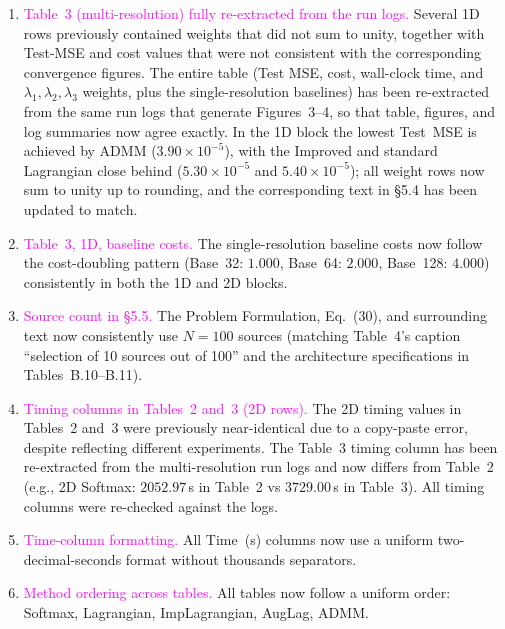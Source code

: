 \documentclass{article}
\newcommand{\audit}[1]{\textcolor{magenta}{#1}}  %
\begin{document}
\begin{enumerate}[leftmargin=*,itemsep=0.4em]
    \item \audit{Table~3 (multi-resolution) fully re-extracted from the run
    logs.} Several 1D rows previously contained weights that did not sum to
    unity, together with Test-MSE and cost values that were not consistent
    with the corresponding convergence figures. The entire table (Test MSE,
    cost, wall-clock time, and $\lambda_1,\lambda_2,\lambda_3$ weights, plus the
    single-resolution baselines) has been re-extracted from the same run logs
    that generate Figures~3--4, so that table, figures, and log summaries now
    agree exactly. In the 1D block the lowest Test~MSE is achieved by ADMM
    ($3.90\times10^{-5}$), with the Improved and standard Lagrangian close
    behind ($5.30\times10^{-5}$ and $5.40\times10^{-5}$); all weight rows now
    sum to unity up to rounding, and the corresponding text in \S5.4 has been
    updated to match.

    \item \audit{Table~3, 1D, baseline costs.} The single-resolution baseline
    costs now follow the cost-doubling pattern
    (Base~32: $1.000$, Base~64: $2.000$, Base~128: $4.000$) consistently in
    both the 1D and 2D blocks.

    \item \audit{Source count in \S5.5.} The Problem Formulation, Eq.~(30), and
    surrounding text now consistently use $N = 100$ sources (matching Table~4's
    caption ``selection of 10 sources out of 100'' and the architecture
    specifications in Tables~B.10--B.11).

    \item \audit{Timing columns in Tables~2 and~3 (2D rows).}
    The 2D timing values in Tables~2 and~3 were previously near-identical due to
    a copy-paste error, despite reflecting different experiments. The Table~3
    timing column has been re-extracted from the multi-resolution run logs and
    now differs from Table~2 (e.g., 2D Softmax: $2052.97$\,s in Table~2 vs
    $3729.00$\,s in Table~3). All timing columns were re-checked against the
    logs.

    \item \audit{Time-column formatting.} All Time~(s) columns now use a uniform
    two-decimal-seconds format without thousands separators.

    \item \audit{Method ordering across tables.} All tables now follow a uniform
    order: Softmax, Lagrangian, ImpLagrangian, AugLag, ADMM.


\end{enumerate}
\end{document}
